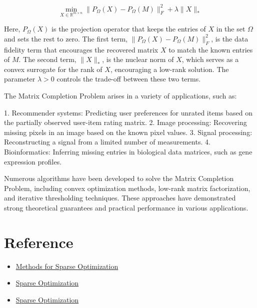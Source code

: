\[
\min_{X \in \mathbb{R}^{m \times n}} \|P_\Omega(X) - P_\Omega(M)\|_F^2 + \lambda \|X\|_*
\]

Here, $P_\Omega(X)$ is the projection operator that keeps the entries of $X$ in the set $\Omega$ and sets the rest to zero. The first term, $\|P_\Omega(X) - P_\Omega(M)\|_F^2$, is the data fidelity term that encourages the recovered matrix $X$ to match the known entries of $M$. The second term, $\|X\|_*$, is the nuclear norm of $X$, which serves as a convex surrogate for the rank of $X$, encouraging a low-rank solution. The parameter $\lambda > 0$ controls the trade-off between these two terms.

The Matrix Completion Problem arises in a variety of applications, such as:

1. Recommender systems: Predicting user preferences for unrated items based on the partially observed user-item rating matrix.
2. Image processing: Recovering missing pixels in an image based on the known pixel values.
3. Signal processing: Reconstructing a signal from a limited number of measurements.
4. Bioinformatics: Inferring missing entries in biological data matrices, such as gene expression profiles.

Numerous algorithms have been developed to solve the Matrix Completion Problem, including convex optimization methods, low-rank matrix factorization, and iterative thresholding techniques. These approaches have demonstrated strong theoretical guarantees and practical performance in various applications.





















\section{Reference}
\begin{itemize}
    \item \href{https://www.math.unipd.it/~rinaldi/teaching/talk.pdf}{Methods for Sparse Optimization}
    \item \href{https://pages.cs.wisc.edu/~swright/talks/sjw-siopt11.pdf}{Sparse Optimization}
    \item \href{http://dsp.ee.cuhk.edu.hk/eleg5481/Lecture%20notes/13-%20compressive%20sensing/cs.pdf}{Sparse Optimization}
\end{itemize}